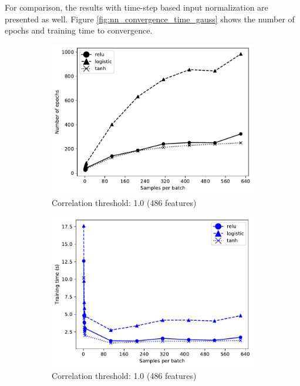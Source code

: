 \documentclass[paper=a4, fontsize=11pt]{scrartcl} %
\begin{document}
For comparison, the results with time-step based input normalization are presented as well.
Figure \ref{fig:nn_convergence_time_gauss} shows the number of epochs and training time to convergence.

\begin{figure}[H]
	\begin{subfigure}{0.5\linewidth}
		\centering
		\includegraphics[width=0.8\linewidth]{../output/neural_network/figures/nn_convergence_time_standard_941_486}
		\caption{Correlation threshold: 1.0 (486 features)}
	\end{subfigure}
	\begin{subfigure}{0.5\linewidth}
		\centering
		\includegraphics[width=0.8\linewidth]{../output/neural_network/figures/nn_convergence_time_standard_941_486_time}
		\caption{Correlation threshold: 1.0 (486 features)}
	\end{subfigure}
	\begin{subfigure}{0.5\linewidth}
		\centering

\end{subfigure}
\end{figure}
\end{document}
